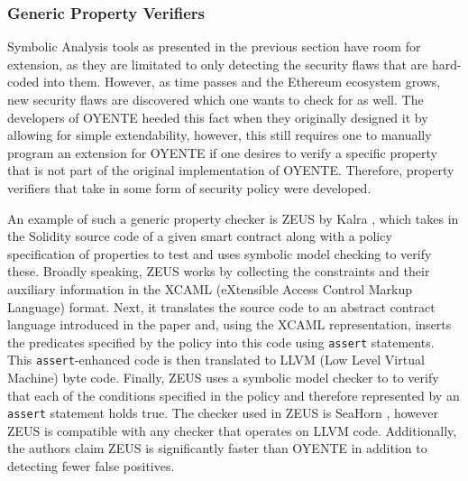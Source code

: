 \documentclass[letterpaper,twocolumn,10pt]{article}
\begin{document}
\subsubsection{Generic Property Verifiers}
Symbolic Analysis tools as presented in the previous section have room for extension, as they are  limitated to only detecting the security flaws that are hard-coded into them. However, as time passes and the Ethereum ecosystem grows, new security flaws are discovered which one wants to check for as well. The developers of OYENTE heeded this fact when they originally designed it by allowing for simple extendability, however, this still requires one to manually program an extension for OYENTE if one desires to verify a specific property that is not part of the original implementation of OYENTE. Therefore, property verifiers that take in some form of security policy were developed. 


An example of such a generic property checker is ZEUS by Kalra \cite{kalra_goel_dhawan_sharma_2018}, which takes in the Solidity source code of a given smart contract along with a policy specification of properties to test and uses symbolic model checking to verify these. Broadly speaking, ZEUS works by collecting the constraints and their auxiliary information in the XCAML (eXtensible Access Control Markup Language) format. Next, it translates the source code to an abstract contract language introduced in the paper and, using the XCAML representation, inserts the predicates specified by the policy into this code using \verb|assert| statements. This \verb|assert|-enhanced code is then translated to LLVM (Low Level Virtual Machine) \cite{lattner_adve} byte code. Finally, ZEUS uses a symbolic model checker to to verify that each of the conditions specified in the policy and therefore represented by an \verb|assert| statement holds true. The checker used in ZEUS is SeaHorn \cite{gurfinkel_kahsai_komuravelli_navas_2015}, however ZEUS is compatible with any checker that operates on LLVM code. Additionally, the authors claim ZEUS is significantly faster than OYENTE in addition to detecting fewer false positives. 
\end{document}
